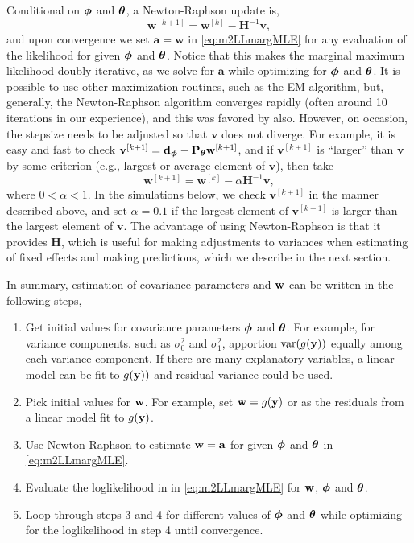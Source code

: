 \documentclass[12pt, titlepage]{article}
\begin{document}
Conditional on $\boldsymbol{\phi}$ and $\boldsymbol{\theta}$, a Newton-Raphson update is,
\[
\mathbf{w}^{[k+1]} = \mathbf{w}^{[k]} - \mathbf{H}^{-1}\mathbf{v},
\]
and upon convergence we set $\mathbf{a} = \mathbf{w}$ in \eqref{eq:m2LLmargMLE} for any evaluation of the likelihood for given $\boldsymbol{\phi}$ and $\boldsymbol{\theta}$.  Notice that this makes the marginal maximum likelihood doubly iterative, as we solve for $\mathbf{a}$ while optimizing for $\boldsymbol{\phi}$ and $\boldsymbol{\theta}$. It is possible to use other maximization routines, such as the EM algorithm, but, generally, the Newton-Raphson algorithm converges rapidly (often around 10 iterations in our experience), and this was favored by \citet{ bonat_practical_2016} also.  However, on occasion, the stepsize needs to be adjusted so that $\mathbf{v}$ does not diverge.  For example, it is easy and fast to check $\mathbf{v}^{[k + 1]} = \mathbf{d}_{\boldsymbol{\phi}} - \mathbf{P}_{\boldsymbol{\theta}}\mathbf{w}^{[k+1]}$, and if $\mathbf{v}^{[k + 1]}$ is ``larger'' than $\mathbf{v}$ by some criterion (e.g., largest or average element of $\mathbf{v}$), then take
\[
\mathbf{w}^{[k+1]} = \mathbf{w}^{[k]} - \alpha\mathbf{H}^{-1}\mathbf{v},
\]
where $0 < \alpha < 1$.  In the simulations below, we check $\mathbf{v}^{[k + 1]}$ in the manner described above, and set $\alpha =0.1$ if the largest element of $\mathbf{v}^{[k + 1]}$ is larger than the largest element of $\mathbf{v}$.  The advantage of using Newton-Raphson is that it provides $\mathbf{H}$, which is useful for making adjustments to variances when estimating of fixed effects and making predictions, which we describe in the next section.

In summary, estimation of covariance parameters and $\mathbf{w}$ can be written in the following steps,
\begin{enumerate}
	\item Get initial values for covariance parameters $\boldsymbol{\phi}$ and $\boldsymbol{\theta}$.  For example, for variance components. such as $\sigma^{2}_{0}$ and $\sigma^{2}_{1}$, apportion $\textrm{var}(g(\mathbf{y}))$ equally among each variance component.  If there are many explanatory variables, a linear model can be fit to $g(\mathbf{y}))$ and residual variance could be used.
	\item Pick initial values for $\mathbf{w}$. For example, set $\mathbf{w} = g(\mathbf{y})$ or as the residuals from a linear model fit to $g(\mathbf{y})$.
	\item Use Newton-Raphson to estimate $\mathbf{w} = \mathbf{a}$ for given $\boldsymbol{\phi}$ and $\boldsymbol{\theta}$ in \eqref{eq:m2LLmargMLE}.
	\item Evaluate the loglikelihood in in \eqref{eq:m2LLmargMLE} for $\mathbf{w}$, $\boldsymbol{\phi}$ and $\boldsymbol{\theta}$.
	\item Loop through steps 3 and 4 for different values of $\boldsymbol{\phi}$ and $\boldsymbol{\theta}$ while optimizing for the loglikelihood in step 4 until convergence.
	
\end{enumerate}
\end{document}
